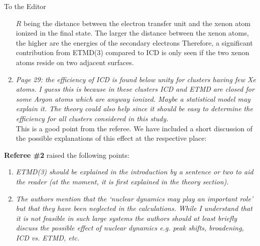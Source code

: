 \documentclass[DIN,pagenumber=false,parskip=half,fromalign=left,fromphone=true,fromemail=true,fromurl=false,fromlogo=false,fromrule=false]{scrlttr2}
\begin{document}
\begin{letter}{To the Editor}
\begin{enumerate}
        $R$ being the distance between the electron transfer unit and the xenon
        atom ionized in the final state.
        The larger the distance between the xenon atoms, the higher are the
        energies of the secondary electrons{\color{blue}{. For the case of xenon
        atoms on argon surfaces this at the same time means a larger distance
        between the Ar-Xe pair involved in the electron transfer and the
        electron emitting xenon atom. Hence, the decay widths are smaller.}}
        Therefore, a
        significant contribution from ETMD(3) compared to ICD is only
        seen if the two xenon atoms reside on two adjacent
        surfaces. 

  \item \emph{Page 29:
        the efficiency of ICD is found below unity for clusters having few Xe atoms. I guess this is because in these clusters ICD and ETMD are closed for some Argon atoms which are anyway ionized. Maybe a statistical model may explain it. The theory could also help since it should be easy to determine the efficiency for all clusters considered in this study.}\vspace{0.3cm}\\
        This is a good point from the referee. We have included a short discussion of the possible explanations of this effect at the respective place: {\color{blue}{In clusters with a low Xe content we can assume that there are Ar atoms that have distances to the next Xe atom that are too large for autoionization to occur. This is especially the case if we have very large clusters that show segregation of Ar and Xe atoms. If we decrease the cluster size, this effect should play a minor role because large distances are not available here. However, with decreasing cluster size, the number of homogeneous clusters in the cluster beam increases. In fact, at small cluster sizes, the size distribution has its maximum at the monomer. This increasing number of homogeneous Ar clusters still show Ar 3s intensity but do not contribute to recorded coincidences because they cannot autoionize. }}


\end{enumerate}

\textbf{Referee \#2} raised the following points:

\begin{enumerate}
 \item \emph{ETMD(3) should be explained in the introduction by a sentence or two to aid the reader (at the moment, it is first explained in the theory section).
}
 \item \emph{The authors mention that the ‘nuclear dynamics may play an important role’ but that they have been neglected in the calculations. While I understand that it is not feasible in such large systems the authors should at least briefly discuss the possible effect of nuclear dynamics e.g. peak shifts, broadening, ICD vs. ETMD, etc. }


\end{enumerate}
\end{letter}
\end{document}
